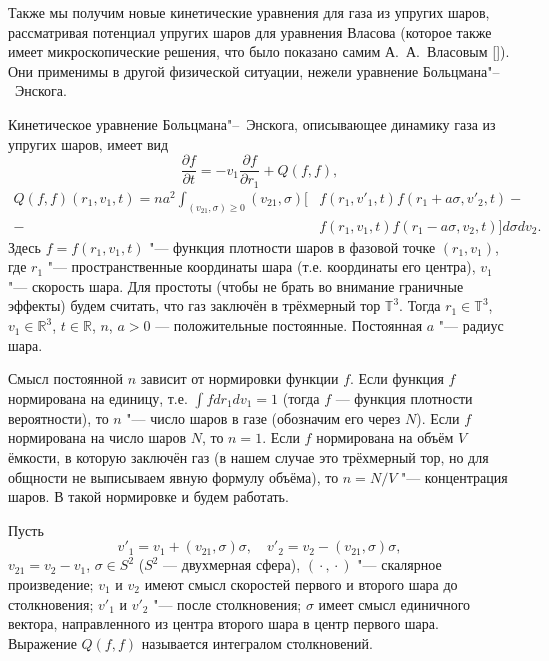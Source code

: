 Также мы получим новые кинетические уравнения для газа из упругих
шаров, рассматривая потенциал упругих шаров для уравнения Власова
(которое также имеет микроскопические решения, что было показано
самим А.~А.~Власовым []). Они применимы в другой
физической ситуации, нежели уравнение Больцмана"--~Энскога.


\smallskip
{}
Кинетическое уравнение Больцмана"--~Энскога, описывающее динамику газа из упругих шаров, имеет вид
\begin{equation}\label{EqBE}
\frac{\partial f}{\partial t}=-v_1\frac{\partial f}{\partial r_1}+Q(f,f),
\end{equation}
\begin{equation*}
\begin{split}
Q(f,f)(r_1,v_1,t)=na^2\int_{(v_{21},\sigma)\geq0}
(v_{21},\sigma)[&f(r_1,v'_1,t)f(r_1+a\sigma,v'_2,t)-\\-&f(r_1,v_1,t)f(r_1-a\sigma,v_2,t)]
d\sigma dv_2.
\end{split}
\end{equation*}
Здесь $f=f(r_1,v_1,t)$ "--- функция плотности шаров в фазовой точке $(r_1,v_1)$, где $r_1$ "--- пространственные координаты шара (т.е. координаты его центра), $v_1$ "--- скорость шара. Для простоты (чтобы не брать во внимание граничные эффекты) будем считать, что газ заключён в трёхмерный тор $\mathbb T^3$. Тогда ${r_1\in\mathbb T^3}$,
$v_1\in\mathbb R^3$, $t\in\mathbb R$, $n$, $a>0$ --- положительные
постоянные. Постоянная $a$ "--- радиус шара.

Смысл постоянной $n$ зависит от нормировки функции $f$. Если функция $f$ нормирована на единицу, т.е. $\int fdr_1dv_1=1$ (тогда $f$ --- функция плотности вероятности), то $n$ "--- число шаров в газе (обозначим его через $N$). Если $f$ нормирована на число шаров $N$, то $n=1$. Если $f$ нормирована на объём $V$ ёмкости, в которую заключён газ (в нашем случае это трёхмерный тор, но для общности не выписываем явную формулу объёма), то $n= N/V$ "--- концентрация шаров. В такой нормировке и будем работать.

Пусть
\begin{equation}
v'_1=v_1+(v_{21},\sigma)\sigma,\quad
v'_2=v_2-(v_{21},\sigma)\sigma,
\end{equation}
$v_{21}=v_2-v_1$, $\sigma\in S^2$ ($S^2$ --- двухмерная сфера),
$({}\cdot{},{}\cdot{})$ "--- скалярное произведение; $v_1$ и $v_2$ имеют смысл скоростей первого и второго шара до столкновения; $v'_1$ и $v'_2$ "--- после столкновения; 
$\sigma$ имеет смысл единичного вектора, направленного из центра второго шара в центр первого шара. 
Выражение $Q(f,f)$ называется интегралом столкновений.

